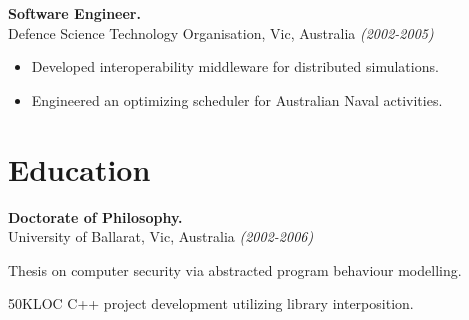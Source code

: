 \documentclass[margin]{res}
\begin{document}
\begin{resume}

{\bf Software Engineer.} \\
Defence Science Technology Organisation, Vic, Australia {\em (2002-2005)} \\
\begin{itemize}
  \item Developed interoperability middleware for distributed simulations.
  \item Engineered an optimizing scheduler for Australian Naval activities.
\end{itemize}





\section{Education}

{\bf Doctorate of Philosophy.} \\
University of Ballarat, Vic, Australia {\em (2002-2006)} \\
\begin{description}
\item Thesis on computer security via abstracted program behaviour modelling.
\item 50KLOC C++ project development utilizing library interposition.
\end{description}


\end{resume}
\end{document}

